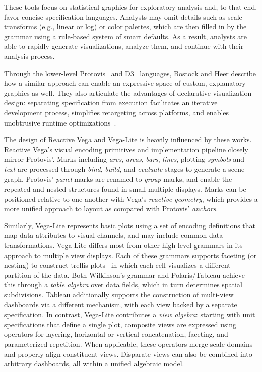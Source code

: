 These tools focus on statistical graphics for exploratory analysis and, to that
end, favor concise specification languages. Analysts may omit details such as
scale transforms (e.g., linear or log) or color palettes, which are then filled
in by the grammar using a rule-based system of smart defaults. As a result,
analysts are able to rapidly generate visualizations, analyze them, and continue
with their analysis process.

Through the lower-level Protovis~\cite{bostock:protovis,heer:protovisjava} and
D3~\cite{bostock:d3} languages, Bostock and Heer describe how a similar approach
can enable an expressive space of custom, explanatory graphics as well. They
also articulate the advantages of declarative visualization design: separating
specification from execution facilitates an iterative development process,
simplifies retargeting across platforms, and enables unobtrusive runtime
optimizations~\cite{heer:protovisjava}.

The design of Reactive Vega and Vega-Lite is heavily influenced by these works.
Reactive Vega's visual encoding primitives and implementation pipeline closely
mirror Protovis'. Marks including \emph{arcs}, \emph{areas}, \emph{bars},
\emph{lines}, plotting \emph{symbols} and \emph{text} are processed through
\emph{bind}, \emph{build}, and \emph{evaluate} stages to generate a scene graph.
Protovis' \emph{panel} marks are renamed to \emph{group} marks, and enable the
repeated and nested structures found in small multiple displays. Marks can be
positioned relative to one-another with Vega's \emph{reactive geometry}, which
provides a more unified approach to layout as compared with Protovis'
\emph{anchors}.

Similarly, Vega-Lite represents basic plots using a set of encoding definitions
that map data attributes to visual channels, and may include common data
transformations. Vega-Lite differs most from other high-level grammars in its
approach to multiple view displays. Each of these grammars supports faceting (or
nesting) to construct trellis plots~\cite{becker:trellis} in which each cell
visualizes a different partition of the data. Both Wilkinson's grammar and
Polaris/Tableau achieve this through a \emph{table algebra} over data fields,
which in turn determines spatial subdivisions. Tableau additionally supports the
construction of multi-view dashboards via a different mechanism, with each view
backed by a separate specification. In contrast, Vega-Lite contributes a
\emph{view algebra}: starting with unit specifications that define a single
plot, composite views are expressed using operators for layering, horizontal or
vertical concatenation, faceting, and parameterized repetition. When applicable,
these operators merge scale domains and properly align constituent views.
Disparate views can also be combined into arbitrary dashboards, all within a
unified algebraic model.

